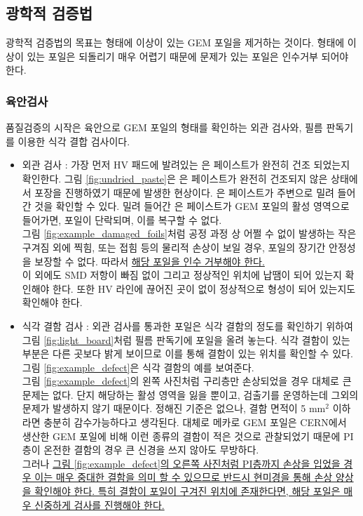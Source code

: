 \documentclass[11pt]{article}
\begin{document}
\subsection{광학적 검증법}
광학적 검증법의 목표는 형태에 이상이 있는 GEM 포일을 제거하는 것이다. 형태에 이상이 있는 포일은 되돌리기 매우 어렵기 때문에 문제가 있는 포일은 인수거부 되어야 한다.

\subsubsection{육안검사}
품질검증의 시작은 육안으로 GEM 포일의 형태를 확인하는 외관 검사와, 필름 판독기를 이용한 식각 결합 검사이다. 
\begin{itemize}
\item 외관 검사 : 가장 먼저 HV 패드에 발려있는 은 페이스트가 완전히 건조 되었는지 확인한다. 그림 \ref{fig:undried_paste}은 은 페이스트가 완전히 건조되지 않은 상태에서 포장을 진행하였기 때문에 발생한 현상이다. 은 페이스트가 주변으로 밀려 들어간 것을 확인할 수 있다. 밀려 들어간 은 페이스트가 GEM 포일의 활성 영역으로 들어가면, 포일이 단락되며, 이를 복구할 수 없다.\\
  그림 \ref{fig:example_damaged_foils}처럼 공정 과정 상 어쩔 수 없이 발생하는 작은 구겨짐 외에 찍힘, 또는 접힘 등의 물리적 손상이 보일 경우, 포일의 장기간 안정성을 보장할 수 없다. 따라서 \uline{해당 포일을 인수 거부해야 한다.}\\
  이 외에도 SMD 저항이 빠짐 없이 그리고 정상적인 위치에 납땜이 되어 있는지 확인해야 한다. 또한 HV 라인에 끊어진 곳이 없이 정상적으로 형성이 되어 있는지도 확인해야 한다.
\item 식각 결함 검사 : 외관 검사를 통과한 포일은 식각 결함의 정도를 확인하기 위하여 그림 \ref{fig:light_board}처럼 필름 판독기에 포일을 올려 놓는다. 식각 결함이 있는 부분은 다른 곳보다 밝게 보이므로 이를 통해 결함이 있는 위치를 확인할 수 있다. 그림 \ref{fig:example_defect}은 식각 결함의 예를 보여준다.\\
  그림 \ref{fig:example_defect}의 왼쪽 사진처럼 구리층만 손상되었을 경우 대체로 큰 문제는 없다. 단지 해당하는 활성 영역을 잃을 뿐이고, 검출기를 운영하는데 그외의 문제가 발생하지 않기 때문이다. 정해진 기준은 없으나, 결함 면적이 5 mm$^2$ 이하라면 충분히 감수가능하다고 생각된다. 대체로 메카로 GEM 포일은 CERN에서 생산한 GEM 포일에 비해 이런 종류의 결함이 적은 것으로 관찰되었기 때문에 PI층이 온전한 결함의 경우 큰 신경을 쓰지 않아도 무방하다.\\
  그러나 \uline{그림 \ref{fig:example_defect}의 오른쪽 사진처럼 PI층까지 손상을 입었을 경우 이는 매우 중대한 결함을 의미 할 수 있으므로 반드시 현미경을 통해 손상 양상을 확인해야 한다. 특히 결함이 포일이 구겨진 위치에 존재한다면, 해당 포일은 매우 신중하게 검사를 진행해야 한다.}
\end{itemize}
\end{document}
